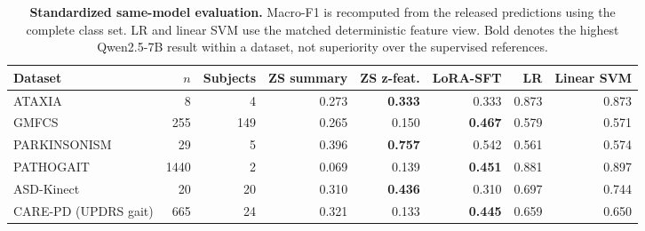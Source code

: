 \begin{table}[H]
\centering
\caption{\textbf{Standardized same-model evaluation.} Macro-F1 is recomputed from the released predictions using the complete class set. LR and linear SVM use the matched deterministic feature view. Bold denotes the highest Qwen2.5-7B result within a dataset, not superiority over the supervised references.}
\label{tab:standardized_summary}
\small
\setlength{\tabcolsep}{3.5pt}
\begin{adjustbox}{max width=\textwidth}
\begin{tabular}{lrrrrrrr}
\toprule
Dataset & $n$ & Subjects & ZS summary & ZS z-feat. & LoRA-SFT & LR & Linear SVM \\
\midrule
ATAXIA & 8 & 4 & 0.273 & \textbf{0.333} & 0.333 & 0.873 & 0.873 \\
GMFCS & 255 & 149 & 0.265 & 0.150 & \textbf{0.467} & 0.579 & 0.571 \\
PARKINSONISM & 29 & 5 & 0.396 & \textbf{0.757} & 0.542 & 0.561 & 0.574 \\
PATHOGAIT & 1440 & 2 & 0.069 & 0.139 & \textbf{0.451} & 0.881 & 0.897 \\
ASD-Kinect & 20 & 20 & 0.310 & \textbf{0.436} & 0.310 & 0.697 & 0.744 \\
CARE-PD (UPDRS gait) & 665 & 24 & 0.321 & 0.133 & \textbf{0.445} & 0.659 & 0.650 \\
\bottomrule
\end{tabular}
\end{adjustbox}
\end{table}
